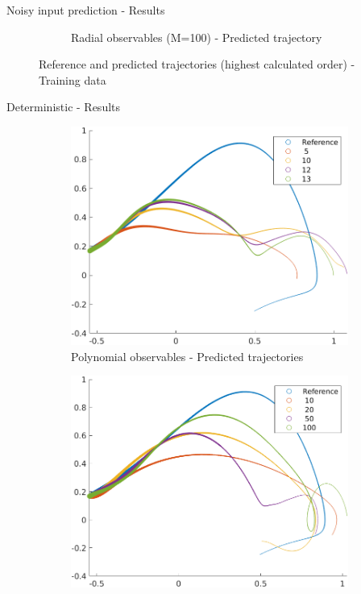 \documentclass{beamer}
\begin{document}
\begin{frame}{Noisy input prediction - Results}
\begin{figure}
\begin{subfigure}[b]{0.45\textwidth}
            \caption{Radial observables (M=100) - Predicted trajectory}
            \label{fig:training_radial}
        \end{subfigure}
        \caption{Reference and predicted trajectories (highest calculated order) - Training data}
    \end{figure}
\end{frame}

\begin{frame}{Deterministic - Results}
    \begin{figure}
        \centering
        \begin{subfigure}[b]{0.45\textwidth}
            \centering
            \includegraphics[width=\textwidth]{Verification_Poly.png}
            \caption{Polynomial observables - Predicted trajectories}
            \label{fig:verification_poly}
        \end{subfigure}
        \hfill
        \begin{subfigure}[b]{0.45\textwidth}
            \centering
            \includegraphics[width=\textwidth]{Verification_Radial.png}

\end{subfigure}
\end{figure}
\end{frame}
\end{document}
